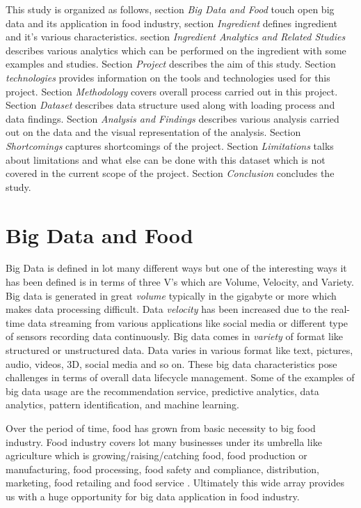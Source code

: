 \documentclass[sigconf]{acmart}
\begin{document}
This study is organized as follows, section \emph{Big Data and Food} touch open big data and its application in food industry, section \emph{Ingredient} defines ingredient and it's various characteristics. section \emph{Ingredient Analytics and Related Studies} describes various analytics which can be performed on the ingredient with some examples and studies. Section \emph{Project} describes the aim of this study. Section \emph{technologies} provides information on the tools and technologies used for this project. Section \emph{Methodology} covers overall process carried out in this project. Section \emph{Dataset} describes data structure used along with loading process and data findings. Section \emph{Analysis and Findings} describes various analysis carried out on the data and the visual representation of the analysis. Section \emph{Shortcomings} captures shortcomings of the project. Section \emph{Limitations} talks about limitations and what else can be done with this dataset which is not covered in the current scope of the project. Section \emph{Conclusion} concludes the study.  

\section{Big Data and Food}
Big Data is defined in lot many different ways but one of the interesting ways it has been defined is in terms of three V's which are Volume, Velocity, and Variety. Big data is generated in great \emph{volume} typically in the gigabyte or more which makes data processing difficult. Data \emph{velocity} has been increased due to the real-time data streaming from various applications like social media or different type of sensors recording data continuously. Big data comes in \emph{variety} of format like structured or unstructured data. Data varies in various format like text, pictures, audio, videos, 3D, social media and so on. These big data characteristics pose challenges in terms of overall data lifecycle management. Some of the examples of big data usage are the recommendation service, predictive analytics, data analytics, pattern identification, and machine learning.

Over the period of time, food has grown from basic necessity to big food industry. Food industry covers lot many businesses under its umbrella like agriculture which is growing/raising/catching food, food production or manufacturing, food processing, food safety and compliance, distribution, marketing, food retailing and food service \cite{www-foodind}. Ultimately this wide array provides us with a huge opportunity for big data application in food industry.
\end{document}

